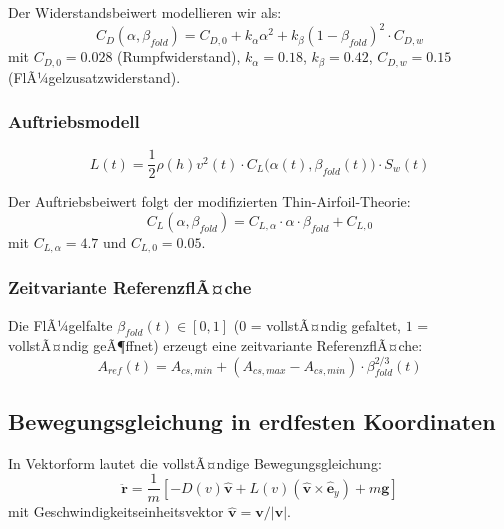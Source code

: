 ﻿\documentclass[12pt,a4paper]{article}
\theoremstyle{remark}
\begin{document}
	Der Widerstandsbeiwert modellieren wir als:
	\begin{equation}
		C_D(\alpha, \beta_{fold}) = C_{D,0} + k_\alpha \alpha^2 + k_\beta (1 - \beta_{fold})^2 \cdot C_{D,w}
		\label{eq:cd_model}
	\end{equation}
	mit $C_{D,0} = 0.028$ (Rumpfwiderstand), $k_\alpha = 0.18$, $k_\beta = 0.42$, $C_{D,w} = 0.15$ (FlÃ¼gelzusatzwiderstand).
	
	\subsubsection{Auftriebsmodell}
	
	\begin{equation}
		L(t) = \frac{1}{2}\rho(h) v^2(t) \cdot C_L\bigl(\alpha(t), \beta_{fold}(t)\bigr) \cdot S_w(t)
		\label{eq:lift}
	\end{equation}
	
	Der Auftriebsbeiwert folgt der modifizierten Thin-Airfoil-Theorie:
	\begin{equation}
		C_L(\alpha, \beta_{fold}) = C_{L,\alpha} \cdot \alpha \cdot \beta_{fold} + C_{L,0}
	\end{equation}
	mit $C_{L,\alpha} = 4.7$ und $C_{L,0} = 0.05$.
	
	\subsubsection{Zeitvariante ReferenzflÃ¤che}
	
	Die FlÃ¼gelfalte $\beta_{fold}(t) \in [0, 1]$ ($0$ = vollstÃ¤ndig gefaltet, $1$ = vollstÃ¤ndig geÃ¶ffnet) erzeugt eine zeitvariante ReferenzflÃ¤che:
	\begin{equation}
		A_{ref}(t) = A_{cs,min} + (A_{cs,max} - A_{cs,min}) \cdot \beta_{fold}^{2/3}(t)
		\label{eq:aref}
	\end{equation}
	
	\subsection{Bewegungsgleichung in erdfesten Koordinaten}
	
	In Vektorform lautet die vollstÃ¤ndige Bewegungsgleichung:
	\begin{equation}
		\ddot{\mathbf{r}} = \frac{1}{m}\left[- D(v) \hat{\mathbf{v}} + L(v)(\hat{\mathbf{v}} \times \hat{\mathbf{e}}_y) + m\mathbf{g}\right]
		\label{eq:eom_full}
	\end{equation}
	mit Geschwindigkeitseinheitsvektor $\hat{\mathbf{v}} = \mathbf{v}/|\mathbf{v}|$.
	
\end{document}
